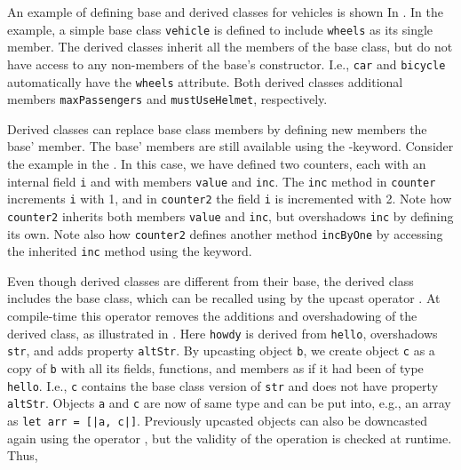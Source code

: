 An example of defining base and derived classes for vehicles is shown In .
%
%
In the example, a simple base class \lstinline{vehicle} is defined to include \lstinline{wheels} as its single member. The derived classes inherit all the members of the base class, but do not have access to any non-members of the base's constructor. I.e., \lstinline{car} and \lstinline{bicycle} automatically have the \lstinline{wheels} attribute. Both derived classes additional members \lstinline{maxPassengers} and \lstinline{mustUseHelmet}, respectively.

Derived classes can replace base class members by defining new members  the base' member. The base' members are still available using the -keyword. Consider the example in the .
%
%
In this case, we have defined two counters, each with an internal field \lstinline{i} and with members \lstinline{value} and \lstinline{inc}. The \lstinline{inc} method in \lstinline{counter} increments \lstinline{i} with 1, and in \lstinline{counter2} the field \lstinline{i} is incremented with 2. Note how \lstinline{counter2} inherits both members \lstinline{value} and \lstinline{inc}, but overshadows \lstinline{inc} by defining its own. Note also how \lstinline{counter2} defines another method \lstinline{incByOne} by accessing the inherited \lstinline{inc} method using the  keyword.

Even though derived classes are different from their base, the derived class includes the base class, which can be recalled using  by the upcast operator \idx[:>@\lstinline{:>}]{\lexeme{:>}}. At compile-time this operator removes the additions and overshadowing of the derived class, as illustrated in . 
%
%
Here \lstinline{howdy} is derived from \lstinline{hello}, overshadows \lstinline{str}, and adds property \lstinline{altStr}. By upcasting object \lstinline{b}, we create object \lstinline{c} as a copy of \lstinline{b} with all its fields, functions, and members as if it had been of type \lstinline{hello}. I.e., \lstinline{c} contains the base class version of \lstinline{str} and does not have property \lstinline{altStr}. Objects \lstinline{a} and \lstinline{c} are now of same type and can be put into, e.g., an array as \lstinline{let arr = [|a, c|]}. Previously upcasted objects can also be downcasted again using the  operator , but the validity of the operation is checked at runtime. Thus, 

